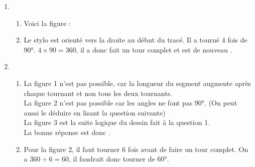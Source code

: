 \begin{enumerate}
    \vspace*{1em}\item 
    \begin{enumerate}[label=\alph*.]
        \vspace*{1em}\item 
    Voici la figure : 
    

    \vspace*{1em}\item Le stylo est orienté vers la droite au début du tracé. Il a tourné 4 fois de 90°. $4\times 90=360$, il a donc fait un tour complet et est de nouveau .
    \end{enumerate}
    
    \vspace*{1em}\item 
    \begin{enumerate}[label=\alph*.]
        \vspace*{1em}\item
        La figure 1 n'est pas possible, car la longueur du segment augmente après chaque tournant et non tous les deux tournants.
        \\ La figure 2 n'est pas possible car les angles ne font pas 90°. (On peut aussi le déduire en lisant la question suivante)
        \\ La figure 3 est la suite logique du dessin fait à la question 1.
        \\ La bonne réponse est donc .

        \vspace*{1em}\item Pour la figure 2, il faut tourner 6 fois avant de faire un tour complet. On a $360\div 6=60$, il faudrait donc tourner de 60°.
    \end{enumerate}
\end{enumerate}


